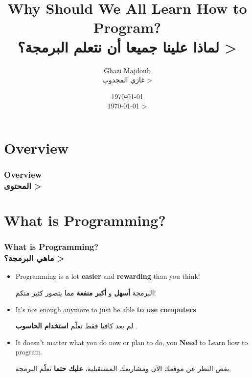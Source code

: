 \documentclass[9pt]{beamer}
\begin{document}

\title{		Why Should We All Learn How to Program?\\ 
			\<
			لماذا علينا جميعا أن نتعلم البرمجة؟
			>
} %
\author{	Ghazi Majdoub\\
			\< 
			غازي المجدوب
			>
}
\date{
			\today\\
			\<
			\today
			>
}

	\begin{frame}
		\titlepage
	\end{frame}
	
	\section*{Overview}
	\begin{frame}
		\frametitle{
			Overview\\
			\<
			المحتوى
			>
		}
		\tableofcontents
	\end{frame}
	
	
	\section{What is Programming?}
	\begin{frame}
		\frametitle{
			What is Programming?\\
			\<
			ماهي البرمجة؟
			>
		}
		
		\begin{itemize}
			\item	Programming is a lot \textbf{easier} and \textbf{rewarding} than you think!
					\begin{arabtext}
					البرمجة
					\textbf{
						أسهل
					}
					و
					\textbf
					{
						أكبر منفعة
					}
					مما يتصور كثير منكم!
					\end{arabtext}
			\item 	It's not enough anymore to just be able \textbf{to use computers}
					\begin{arabtext}
					لم يعد كافيا فقط تعلّم 
					\textbf{
						استخدام الحاسوب
					}.
					\end{arabtext}
			\item 	It doesn't matter what you do now or plan to do, you \textbf{Need} to Learn how to program.
					\begin{arabtext}
					بغض النظر عن موقعك الآن ومشاريعك المستقبلية،
					\textbf{
						عليك حتما
					}
					تعلّم البرمجة.
					\end{arabtext}
		\end{itemize}
	\end{frame}
	
\end{document}
